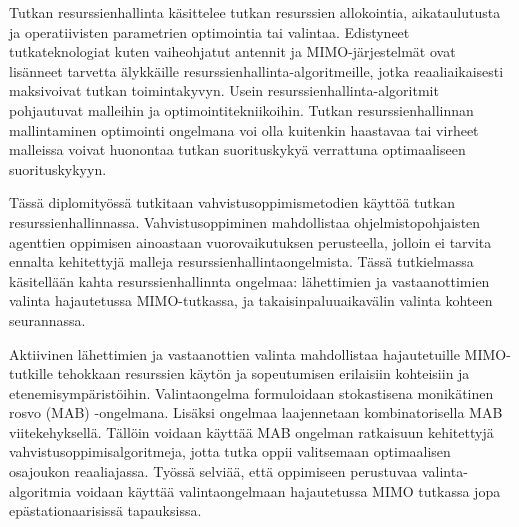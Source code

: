 \documentclass[english, 12pt, a4paper, elec, utf8, a-1b, online]{aaltothesis}
\numberwithin{equation}{section}
\begin{document}
\newpage
\begin{abstractpage}[finnish]
Tutkan resurssienhallinta käsittelee tutkan resurssien allokointia, aikataulutusta ja operatiivisten parametrien optimointia tai valintaa. 
Edistyneet tutkateknologiat kuten vaiheohjatut antennit ja MIMO-järjestelmät ovat lisänneet tarvetta älykkäille resurssienhallinta-algoritmeille, jotka reaaliaikaisesti maksivoivat tutkan toimintakyvyn. 
Usein resurssienhallinta-algoritmit pohjautuvat malleihin ja optimointitekniikoihin. Tutkan resurssienhallinnan mallintaminen optimointi ongelmana voi olla kuitenkin haastavaa tai virheet malleissa voivat huonontaa tutkan suorituskykyä verrattuna optimaaliseen suorituskykyyn.

Tässä diplomityössä tutkitaan vahvistusoppimismetodien käyttöä tutkan resurssienhallinnassa. Vahvistusoppiminen mahdollistaa ohjelmistopohjaisten agenttien oppimisen ainoastaan vuorovaikutuksen perusteella, jolloin ei tarvita ennalta kehitettyjä malleja resurssienhallintaongelmista.
Tässä tutkielmassa käsitellään kahta resurssienhallinnta ongelmaa: lähettimien ja vastaanottimien valinta hajautetussa MIMO-tutkassa, ja takaisinpaluuaikavälin valinta kohteen seurannassa.

Aktiivinen lähettimien ja vastaanottien valinta  mahdollistaa hajautetuille MIMO-tutkille tehokkaan resurssien käytön ja sopeutumisen erilaisiin kohteisiin ja etenemisympäristöihin. 
Valintaongelma formuloidaan stokastisena monikätinen rosvo (MAB) -ongelmana. Lisäksi ongelmaa laajennetaan kombinatorisella MAB viitekehyksellä. Tällöin voidaan käyttää MAB ongelman ratkaisuun kehitettyjä vahvistusoppimisalgoritmeja, jotta tutka oppii valitsemaan optimaalisen osajoukon reaaliajassa. Työssä selviää, että oppimiseen perustuvaa valinta-algoritmia voidaan käyttää valintaongelmaan hajautetussa MIMO tutkassa jopa epästationaarisissä tapauksissa.


\end{abstractpage}
\end{document}
